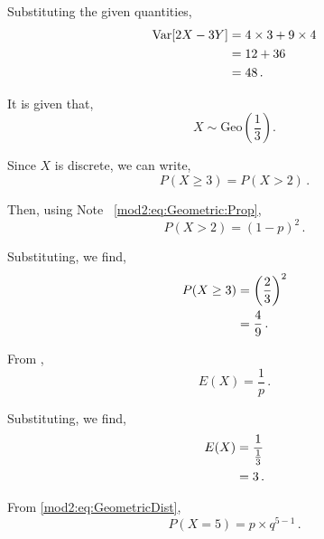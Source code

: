 \begin{subquestions}
\begin{subsubquestions}
Substituting the given quantities,
\begin{align}
	\text{Var}[2X-3Y] & = 4 \times 3 + 9 \times 4 \nonumber \\
	           & = 12 + 36 \nonumber \\
	           & = 48 \,.	
\end{align}

\end{subsubquestions}


\subquestion

It is given that,
\begin{equation}
	X \sim \text{Geo}\left(\frac{1}{3}\right).
\end{equation}

\begin{subsubquestions}

\subsubquestion
Since $X$ is discrete, we can write,
\begin{equation}
	P(X\geq 3) = P(X>2) \,.
\end{equation}

Then, using Note ~\ref{mod2:eq:Geometric:Prop}, 
\begin{equation}
	P(X > 2) = (1-p)^2\,.
\end{equation}

Substituting, we find,
\begin{align}
	P(X\geq 3) & = \left(\frac{2}{3} \right)^2 \nonumber \\
	           & = \frac{4}{9} \,.
\end{align}


\subsubquestion
From ,
\begin{equation}
	E(X) = \frac{1}{p} \,.
\end{equation}

Substituting, we find,
\begin{align}
	E(X) & = \frac{1}{\frac{1}{3}} \nonumber \\
	     & = 3 \,.
\end{align}


\subsubquestion
From \ref{mod2:eq:GeometricDist}, 
\begin{equation}
	P(X=5) = p \times q^{5-1} \,.
\end{equation}


\end{subsubquestions}
\end{subquestions}
